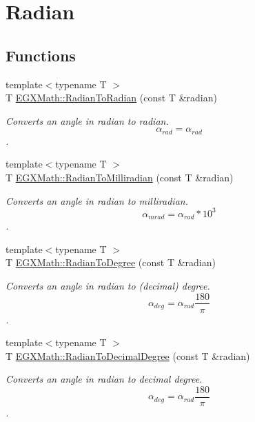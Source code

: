\hypertarget{group___e_g_x_math-_angle_conversions-_radian}{}\section{Radian}
\label{group___e_g_x_math-_angle_conversions-_radian}
\subsection*{Functions}
\begin{DoxyCompactItemize}
\item 
{\footnotesize template$<$typename T $>$ }\\T \mbox{\hyperlink{group___e_g_x_math-_angle_conversions-_radian_gae08681bd86b8e7e4325f6c8cb3a0dc37}{E\+G\+X\+Math\+::\+Radian\+To\+Radian}} (const T \&radian)
\begin{DoxyCompactList}\small\item\em Converts an angle in radian to radian. \[\alpha_{rad}=\alpha_{rad}\]. \end{DoxyCompactList}\item 
{\footnotesize template$<$typename T $>$ }\\T \mbox{\hyperlink{group___e_g_x_math-_angle_conversions-_radian_gaea391f0cca39b05e298dd1cae162e7f1}{E\+G\+X\+Math\+::\+Radian\+To\+Milliradian}} (const T \&radian)
\begin{DoxyCompactList}\small\item\em Converts an angle in radian to milliradian. \[\alpha_{mrad}=\alpha_{rad}*10^3\]. \end{DoxyCompactList}\item 
{\footnotesize template$<$typename T $>$ }\\T \mbox{\hyperlink{group___e_g_x_math-_angle_conversions-_radian_ga25bbce6cdc1c3621f2a158d320e3bc45}{E\+G\+X\+Math\+::\+Radian\+To\+Degree}} (const T \&radian)
\begin{DoxyCompactList}\small\item\em Converts an angle in radian to (decimal) degree. \[\alpha_{deg}=\alpha_{rad}\frac{180}{\pi}\]. \end{DoxyCompactList}\item 
{\footnotesize template$<$typename T $>$ }\\T \mbox{\hyperlink{group___e_g_x_math-_angle_conversions-_radian_ga6d170f1882c32de53167c04524d05f67}{E\+G\+X\+Math\+::\+Radian\+To\+Decimal\+Degree}} (const T \&radian)
\begin{DoxyCompactList}\small\item\em Converts an angle in radian to decimal degree. \[\alpha_{deg}=\alpha_{rad}\frac{180}{\pi}\]. \end{DoxyCompactList}\item 

\end{DoxyCompactItemize}
